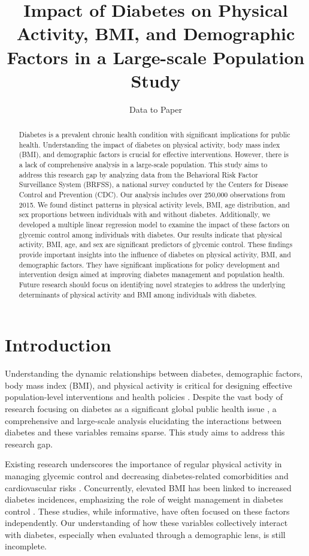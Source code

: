 \documentclass[11pt]{article}
\title{Impact of Diabetes on Physical Activity, BMI, and Demographic Factors in a Large-scale Population Study}
\author{Data to Paper}
\begin{document}
\maketitle
\begin{abstract}Diabetes is a prevalent chronic health condition with significant implications for public health. Understanding the impact of diabetes on physical activity, body mass index (BMI), and demographic factors is crucial for effective interventions. However, there is a lack of comprehensive analysis in a large-scale population. This study aims to address this research gap by analyzing data from the Behavioral Risk Factor Surveillance System (BRFSS), a national survey conducted by the Centers for Disease Control and Prevention (CDC). Our analysis includes over 250,000 observations from 2015. We found distinct patterns in physical activity levels, BMI, age distribution, and sex proportions between individuals with and without diabetes. Additionally, we developed a multiple linear regression model to examine the impact of these factors on glycemic control among individuals with diabetes. Our results indicate that physical activity, BMI, age, and sex are significant predictors of glycemic control. These findings provide important insights into the influence of diabetes on physical activity, BMI, and demographic factors. They have significant implications for policy development and intervention design aimed at improving diabetes management and population health. Future research should focus on identifying novel strategies to address the underlying determinants of physical activity and BMI among individuals with diabetes.\end{abstract}
\section*{Introduction}

Understanding the dynamic relationships between diabetes, demographic factors, body mass index (BMI), and physical activity is critical for designing effective population-level interventions and health policies \cite{Hill-Briggs2020SocialDO}. Despite the vast body of research focusing on diabetes as a significant global public health issue \cite{Khan2019EpidemiologyOT, Mozaffarian2016DietaryAP}, a comprehensive and large-scale analysis elucidating the interactions between diabetes and these variables remains sparse. This study aims to address this research gap.

Existing research underscores the importance of regular physical activity in managing glycemic control and decreasing diabetes-related comorbidities and cardiovascular risks \cite{Bohn2015ImpactOP}. Concurrently, elevated BMI has been linked to increased diabetes incidences, emphasizing the role of weight management in diabetes control \cite{Chen2018AssociationOB, Jafar2006PrevalenceOO}. These studies, while informative, have often focused on these factors independently. Our understanding of how these variables collectively interact with diabetes, especially when evaluated through a demographic lens, is still incomplete.
\end{document}
